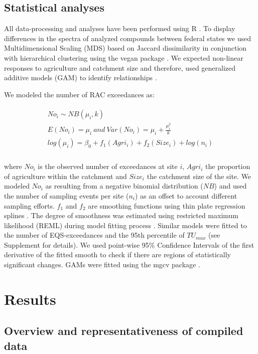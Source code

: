 \documentclass[journal=esthag,manuscript=article]{achemso}
\begin{document}
\subsection{Statistical analyses}

All data-processing and analyses have been performed using R \citep{r_core_team_r:_2016}.
To display differences in the spectra of analyzed compounds between federal states we used Multidimensional Scaling (MDS) based on Jaccard dissimilarity in conjunction with hierarchical clustering using the vegan package \citep{oksanen_vegan:_2016}.
We expected non-linear responses to agriculture and catchment size and therefore, used generalized additive models (GAM) to identify relationships \citep{fewster_analysis_2000}.

We modeled the number of RAC exceedances as:

\begin{align}
\begin{split}
  No_i \sim NB(\mu_i, k) \\
  E(No_i) = \mu_i~and~Var(No_i) = \mu_i + \frac{\mu_i^2}{k} \\
  log(\mu_i)= \beta_0 + f_1(Agri_i) + f_2(Size_i) + log(n_i) \\
\end{split}
\end{align}

where $No_i$ is the observed number of exceedances at site $i$, $Agri_i$ the proportion of agriculture within the catchment and $Size_i$ the catchment size of the site. 
We modeled $No_i$ as resulting from a negative binomial distribution ($NB$) and used the number of sampling events per site ($n_i$) as an offset to account different sampling efforts. 
$f_1$ and $f_2$ are smoothing functions using thin plate regression splines \citep{wood_thin_2003}.
The degree of smoothness was estimated using restricted maximum likelihood (REML) during model fitting process \citep{wood_fast_2011}.
Similar models were fitted to the number of EQS-exceedances and the 95th percentile of $TU_{max}$ (see Supplement for details). 
We used point-wise 95\% Confidence Intervals of the first derivative of the fitted smooth to check if there are regions of statistically significant changes.
GAMs were fitted using the mgcv package \citep{wood_fast_2011}.


\section{Results}
\subsection{Overview and representativeness of compiled data}
\end{document}
